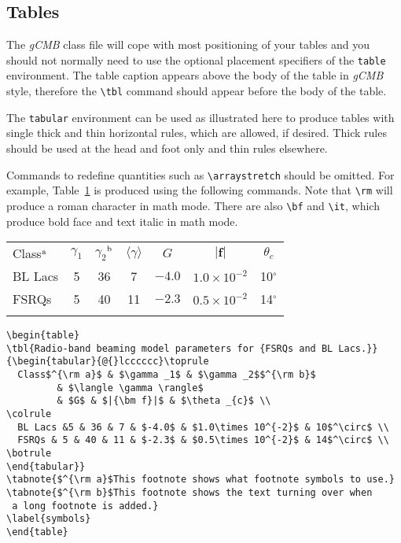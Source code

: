 \documentclass{gCMB2e}
\begin{document}
\subsection{Tables}

The \textit{gCMB} class file will cope with most positioning of your tables and you should not normally need to use the optional
placement specifiers of the \texttt{table} environment. The table caption appears above the body of the table in {\it gCMB} style,
therefore the \verb"\tbl" command should appear before the body of the table.

The {\tt tabular} environment can be used as illustrated here to produce tables with single thick and thin horizontal rules, which
are allowed, if desired. Thick rules should be used at the head and foot only and thin rules elsewhere.

Commands to redefine quantities such as \verb"\arraystretch" should be omitted. For example, Table~\ref{symbols}
is produced using the following commands. Note that \verb"\rm" will produce a roman character in math mode. There
are also \verb"\bf" and \verb"\it", which produce bold face and text italic in math mode.

\begin{table}
{\begin{tabular}[l]{@{}lcccccc}\toprule
  Class$^{\rm a}$ & $\gamma _1$ & $\gamma _2$$^{\rm b}$
         & $\langle \gamma \rangle$
         & $G$ & $|{\bm f}|$ & $\theta _{c}$ \\
\colrule
  BL Lacs &5 & 36 & 7 & $-4.0$ & $1.0\times 10^{-2}$ & 10$^\circ$ \\
  FSRQs & 5 & 40 & 11 & $-2.3$ & $0.5\times 10^{-2}$ & 14$^\circ$ \\
\botrule
\end{tabular}}
\label{symbols}
\end{table}

\begin{verbatim}
\begin{table}
\tbl{Radio-band beaming model parameters for {FSRQs and BL Lacs.}}
{\begin{tabular}{@{}lcccccc}\toprule
  Class$^{\rm a}$ & $\gamma _1$ & $\gamma _2$$^{\rm b}$
         & $\langle \gamma \rangle$
         & $G$ & $|{\bm f}|$ & $\theta _{c}$ \\
\colrule
  BL Lacs &5 & 36 & 7 & $-4.0$ & $1.0\times 10^{-2}$ & 10$^\circ$ \\
  FSRQs & 5 & 40 & 11 & $-2.3$ & $0.5\times 10^{-2}$ & 14$^\circ$ \\
\botrule
\end{tabular}}
\tabnote{$^{\rm a}$This footnote shows what footnote symbols to use.}
\tabnote{$^{\rm b}$This footnote shows the text turning over when
 a long footnote is added.}
\label{symbols}
\end{table}
\end{verbatim}
\end{document}
